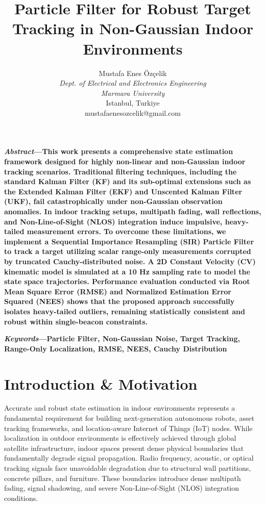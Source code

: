 \documentclass[10pt,twocolumn,a4paper]{article}
\begin{document}
\title{\Large \textbf{Particle Filter for Robust Target Tracking in Non-Gaussian Indoor Environments}}

\author{
Mustafa Enes \"Oz\c{c}elik \\
\textit{Dept. of Electrical and Electronics Engineering}\\
\textit{Marmara University}\\
Istanbul, Turkiye \\
mustafaenesozcelik@gmail.com
}
\date{}

\maketitle

\textbf{\textit{Abstract}---This work presents a comprehensive state estimation framework designed for highly non-linear and non-Gaussian indoor tracking scenarios. Traditional filtering techniques, including the standard Kalman Filter (KF) and its sub-optimal extensions such as the Extended Kalman Filter (EKF) and Unscented Kalman Filter (UKF), fail catastrophically under non-Gaussian observation anomalies. In indoor tracking setups, multipath fading, wall reflections, and Non-Line-of-Sight (NLOS) integration induce impulsive, heavy-tailed measurement errors. To overcome these limitations, we implement a Sequential Importance Resampling (SIR) Particle Filter to track a target utilizing scalar range-only measurements corrupted by truncated Cauchy-distributed noise. A 2D Constant Velocity (CV) kinematic model is simulated at a 10 Hz sampling rate to model the state space trajectories. Performance evaluation conducted via Root Mean Square Error (RMSE) and Normalized Estimation Error Squared (NEES) shows that the proposed approach successfully isolates heavy-tailed outliers, remaining statistically consistent and robust within single-beacon constraints.}

\vspace{1em}
\textbf{\textit{Keywords}---Particle Filter, Non-Gaussian Noise, Target Tracking, Range-Only Localization, RMSE, NEES, Cauchy Distribution}

\section{Introduction \& Motivation}
Accurate and robust state estimation in indoor environments represents a fundamental requirement for building next-generation autonomous robots, asset tracking frameworks, and location-aware Internet of Things (IoT) nodes. While localization in outdoor environments is effectively achieved through global satellite infrastructure, indoor spaces present dense physical boundaries that fundamentally degrade signal propagation. Radio frequency, acoustic, or optical tracking signals face unavoidable degradation due to structural wall partitions, concrete pillars, and furniture. These boundaries introduce dense multipath fading, signal shadowing, and severe Non-Line-of-Sight (NLOS) integration conditions.
\end{document}
